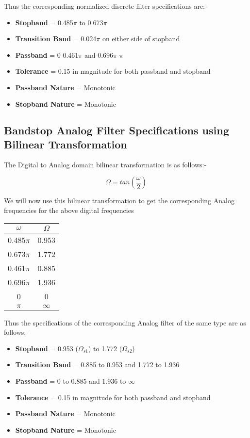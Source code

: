 \documentclass[12pt]{article}
\begin{document}
Thus the corresponding normalized discrete filter specifications are:-
\begin{itemize}
    \item \textbf{Stopband} = 0.485$\pi$ to 0.673$\pi$
    \item \textbf{Transition Band} = 0.024$\pi$ on either side of stopband
    \item \textbf{Passband} = 0-0.461$\pi$ and 0.696$\pi$-$\pi$
    \item\textbf{Tolerance} = 0.15 in magnitude for both passband and stopband
    \item \textbf{Passband Nature} = Monotonic
    \item \textbf{Stopband Nature} = Monotonic
\end{itemize}

\subsection{Bandstop Analog Filter Specifications using Bilinear Transformation}
The Digital to Analog domain bilinear transformation is as follows:-

\[\Omega = tan(\frac{\omega}{2})\]


\noindent
We will now use this bilinear transformation to get the corresponding Analog frequencies for the above digital frequencies

\begin{center}
    \begin{tabular}{|c|c|}
     \hline
    $\omega$ & $\Omega$ \\ \hline
    0.485$\pi$ & 0.953 \\ \hline
    0.673$\pi$ & 1.772 \\ \hline
    0.461$\pi$ & 0.885 \\ \hline
    0.696$\pi$ & 1.936 \\ \hline
    0 & 0 \\ \hline
    $\pi$ & $\infty$ \\ \hline
    \end{tabular}
\end{center}
\newpage

\noindent

Thus the specifications of the corresponding Analog filter of the same type are as follows:-

\begin{itemize}
    \item \textbf{Stopband} = 0.953 ($\Omega_{s1}$) to 1.772 ($\Omega_{s2}$)
    \item \textbf{Transition Band} = 0.885 to 0.953 and 1.772 to 1.936
    \item \textbf{Passband} = 0 to 0.885 and 1.936 to $\infty$
    \item\textbf{Tolerance} = 0.15 in magnitude for both passband and stopband
    \item \textbf{Passband Nature} = Monotonic
    \item \textbf{Stopband Nature} = Monotonic
\end{itemize}
\end{document}
